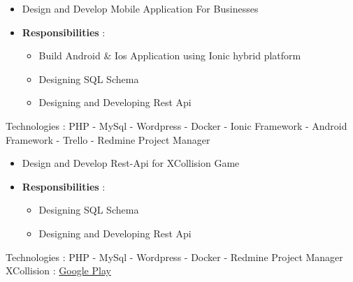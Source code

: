 \documentclass[10pt,a4paper]{altacv}
\begin{document}
\begin{itemize}
\item Design and Develop Mobile Application For Businesses
\item \textbf{Responsibilities} :

\begin{itemize}
    \item Build Android \& Ios Application  using Ionic hybrid platform  
    \item Designing SQL Schema 
    \item Designing and Developing Rest Api
\end{itemize}
\end{itemize}
				\item Technologies : 
                {PHP - MySql - Wordpress - Docker - Ionic Framework - Android Framework - Trello - Redmine Project Manager}

\divider
{}
\begin{itemize}
\item Design and Develop Rest-Api for XCollision Game
\item \textbf{Responsibilities} :

\begin{itemize}
    \item Designing SQL Schema 
    \item Designing and Developing Rest Api
\end{itemize}
\end{itemize}
				\item Technologies : 
                {PHP - MySql - Wordpress - Docker  - Redmine Project Manager
                {XCollision}  : \href{https://play.google.com/store/apps/details?id=com.Datis.Sadrneshin}{ Google Play}}
         
\divider

	
\end{document}

